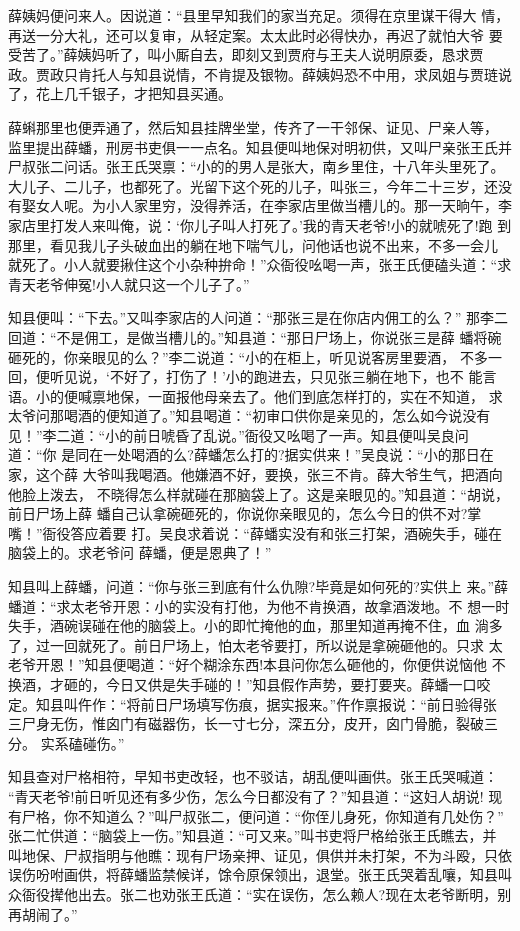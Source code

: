 薛姨妈便问来人。因说道：“县里早知我们的家当充足。须得在京里谋干得大
情，再送一分大礼，还可以复审，从轻定案。太太此时必得快办，再迟了就怕大爷
要受苦了。”薛姨妈听了，叫小厮自去，即刻又到贾府与王夫人说明原委，恳求贾
政。贾政只肯托人与知县说情，不肯提及银物。薛姨妈恐不中用，求凤姐与贾琏说
了，花上几千银子，才把知县买通。

薛蝌那里也便弄通了，然后知县挂牌坐堂，传齐了一干邻保、证见、尸亲人等，
监里提出薛蟠，刑房书吏俱一一点名。知县便叫地保对明初供，又叫尸亲张王氏并
尸叔张二问话。张王氏哭禀：“小的的男人是张大，南乡里住，十八年头里死了。
大儿子、二儿子，也都死了。光留下这个死的儿子，叫张三，今年二十三岁，还没
有娶女人呢。为小人家里穷，没得养活，在李家店里做当槽儿的。那一天晌午，李
家店里打发人来叫俺，说：‘你儿子叫人打死了。’我的青天老爷!小的就唬死了!跑
到那里，看见我儿子头破血出的躺在地下喘气儿，问他话也说不出来，不多一会儿
就死了。小人就要揪住这个小杂种拚命！”众衙役吆喝一声，张王氏便磕头道：“求
青天老爷伸冤!小人就只这一个儿子了。”

知县便叫：“下去。”又叫李家店的人问道：“那张三是在你店内佣工的么？”
那李二回道：“不是佣工，是做当槽儿的。”知县道：“那日尸场上，你说张三是薛
蟠将碗砸死的，你亲眼见的么？”李二说道：“小的在柜上，听见说客房里要酒，
不多一回，便听见说，‘不好了，打伤了！’小的跑进去，只见张三躺在地下，也不
能言语。小的便喊禀地保，一面报他母亲去了。他们到底怎样打的，实在不知道，
求太爷问那喝酒的便知道了。”知县喝道：“初审口供你是亲见的，怎么如今说没有
见！”李二道：“小的前日唬昏了乱说。”衙役又吆喝了一声。知县便叫吴良问道：“你
是同在一处喝酒的么?薛蟠怎么打的?据实供来！”吴良说：“小的那日在家，这个薛
大爷叫我喝酒。他嫌酒不好，要换，张三不肯。薛大爷生气，把酒向他脸上泼去，
不晓得怎么样就碰在那脑袋上了。这是亲眼见的。”知县道：“胡说，前日尸场上薛
蟠自己认拿碗砸死的，你说你亲眼见的，怎么今日的供不对?掌嘴！”衙役答应着要
打。吴良求着说：“薛蟠实没有和张三打架，酒碗失手，碰在脑袋上的。求老爷问
薛蟠，便是恩典了！”

知县叫上薛蟠，问道：“你与张三到底有什么仇隙?毕竟是如何死的?实供上
来。”薛蟠道：“求太老爷开恩：小的实没有打他，为他不肯换酒，故拿酒泼地。不
想一时失手，酒碗误碰在他的脑袋上。小的即忙掩他的血，那里知道再掩不住，血
淌多了，过一回就死了。前日尸场上，怕太老爷要打，所以说是拿碗砸他的。只求
太老爷开恩！”知县便喝道：“好个糊涂东西!本县问你怎么砸他的，你便供说恼他
不换酒，才砸的，今日又供是失手碰的！”知县假作声势，要打要夹。薛蟠一口咬
定。知县叫仵作：“将前日尸场填写伤痕，据实报来。”仵作禀报说：“前日验得张
三尸身无伤，惟囟门有磁器伤，长一寸七分，深五分，皮开，囟门骨脆，裂破三分。
实系磕碰伤。”

知县查对尸格相符，早知书吏改轻，也不驳诘，胡乱便叫画供。张王氏哭喊道：
“青天老爷!前日听见还有多少伤，怎么今日都没有了？”知县道：“这妇人胡说!
现有尸格，你不知道么？”叫尸叔张二，便问道：“你侄儿身死，你知道有几处伤？”
张二忙供道：“脑袋上一伤。”知县道：“可又来。”叫书吏将尸格给张王氏瞧去，并
叫地保、尸叔指明与他瞧：现有尸场亲押、证见，俱供并未打架，不为斗殴，只依
误伤吩咐画供，将薛蟠监禁候详，馀令原保领出，退堂。张王氏哭着乱嚷，知县叫
众衙役撵他出去。张二也劝张王氏道：“实在误伤，怎么赖人?现在太老爷断明，别
再胡闹了。”

